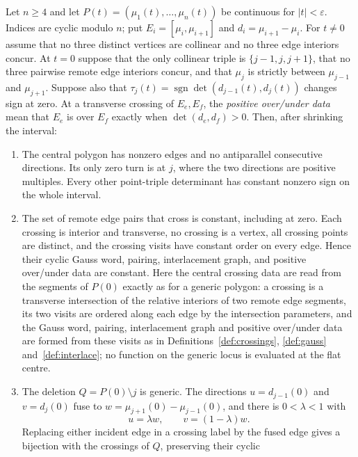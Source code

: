 \begin{lemma}\label{lem:flat-sides}
Let $n\geq4$ and let $P(t)=(\mu_1(t),\ldots,\mu_n(t))$ be continuous for
$|t|<\varepsilon$. Indices are cyclic modulo $n$; put
$E_i=[\mu_i,\mu_{i+1}]$ and $d_i=\mu_{i+1}-\mu_i$.
For $t\ne0$ assume that no three distinct vertices are collinear and no
three edge interiors concur. At $t=0$ suppose that the only collinear
triple is $\{j-1,j,j+1\}$, that no three pairwise remote edge interiors
concur, and that $\mu_j$ is strictly between $\mu_{j-1}$ and
$\mu_{j+1}$. Suppose also that
$\tau_j(t)=\operatorname{sgn}\det(d_{j-1}(t),d_j(t))$ changes sign at zero.
At a transverse crossing of $E_e,E_f$, the \emph{positive over/under
data} mean that $E_e$ is over $E_f$ exactly when $\det(d_e,d_f)>0$.
Then, after shrinking the interval:
\begin{enumerate}
\item[(i)] The central polygon has nonzero edges and no antiparallel
consecutive directions. Its only zero turn is at $j$, where the two
directions are positive multiples. Every other point-triple determinant
has constant nonzero sign on the whole interval.
\item[(ii)] The set of remote edge pairs that cross is constant,
including at zero. Each crossing is interior and transverse, no crossing
is a vertex, all crossing points are distinct, and the crossing visits
have constant order on every edge. Hence their cyclic Gauss word,
pairing, interlacement graph, and positive over/under data are constant.
Here the central crossing data are read from the segments of $P(0)$
exactly as for a generic polygon: a crossing is a transverse intersection
of the relative interiors of two remote edge segments, its two visits are
ordered along each edge by the intersection parameters, and the Gauss
word, pairing, interlacement graph and positive over/under data are formed
from these visits as in Definitions~\ref{def:crossings}, \ref{def:gauss}
and~\ref{def:interlace}; no function on the generic locus is evaluated at
the flat centre.
\item[(iii)] The deletion $Q=P(0)\setminus j$ is generic. The directions
$u=d_{j-1}(0)$ and $v=d_j(0)$ fuse to $w=\mu_{j+1}(0)-\mu_{j-1}(0)$,
and there is $0<\lambda<1$ with
\begin{equation}\label{flatpr:fusion}
u=\lambda w,\qquad v=(1-\lambda)w.
\end{equation}
Replacing either incident edge in a crossing label by the fused edge
gives a bijection with the crossings of $Q$, preserving their cyclic

\end{enumerate}
\end{lemma}
